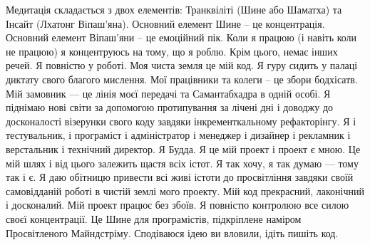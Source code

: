 Медитація складається з двох елементів: Транквіліті (Шине або Шаматха) та
Інсайт (Лхатонг Віпаш'яна). Основний елемент Шине – це концентрація. Основний
елемент Віпаш'яни – це емоційний пік. Коли я працюю (і навіть коли не працюю)
я концентруюсь на тому, що я роблю. Крім цього, немає інших речей. Я повністю
у роботі. Моя чиста земля це мій код. Я гуру сидить у палаці диктату свого благого
мислення. Мої працівники та колеги – це збори бодхісатв. Мій замовник --- це лінія моєї
передачі та Самантабхадра в одній особі. Я піднімаю нові світи за допомогою протипування
за лічені дні і доводжу до досконалості візерунки свого коду завдяки інкременткальному
рефакторінгу. Я і тестувальник, і програміст і адміністратор і менеджер і дизайнер і
рекламник і верстальник і технічний директор. Я Будда. Я це мій проект і проект є мною.
Це мій шлях і від цього залежить щастя всіх істот. Я так хочу, я так думаю ---
тому так і є. Я даю обітницю привести всі живі істоти до просвітління завдяки
своїй самовідданій роботі в чистій землі мого проекту. Мій код прекрасний, лаконічний
і досконалий. Мій проект працює без збоїв. Я повністю контролюю все силою своєї концентрації.
Це Шине для програмістів, підкріплене наміром Просвітленого Майндстріму.
Сподіваюся ідею ви вловили, ідіть пишіть код.
